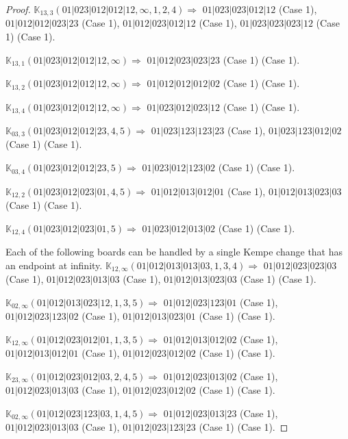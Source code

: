\documentclass[12pt]{article}
\newcommand{\K}{\mathbb{K}}
\begin{document}
\begin{proof}
\bigskip

$\K_{13,3}(01|023|012|012|12,\infty,1, 2, 4)\Rightarrow $ $01|023|023|012|12$ (Case 1), $01|012|012|023|23$ (Case 1), $01|012|023|012|12$ (Case 1), $01|023|023|023|12$ (Case 1) (Case 1).

$\K_{13,1}(01|023|012|012|12,\infty)\Rightarrow $ $01|012|023|023|23$ (Case 1) (Case 1).

$\K_{13,2}(01|023|012|012|12,\infty)\Rightarrow $ $01|012|012|012|02$ (Case 1) (Case 1).

$\K_{13,4}(01|023|012|012|12,\infty)\Rightarrow $ $01|023|012|023|12$ (Case 1) (Case 1).


\bigskip

$\K_{03,3}(01|023|012|012|23,4, 5)\Rightarrow $ $01|023|123|123|23$ (Case 1), $01|023|123|012|02$ (Case 1) (Case 1).

$\K_{03,4}(01|023|012|012|23,5)\Rightarrow $ $01|023|012|123|02$ (Case 1) (Case 1).


\bigskip

$\K_{12,2}(01|023|012|023|01,4, 5)\Rightarrow $ $01|012|013|012|01$ (Case 1), $01|012|013|023|03$ (Case 1) (Case 1).

$\K_{12,4}(01|023|012|023|01,5)\Rightarrow $ $01|023|012|013|02$ (Case 1) (Case 1).


\bigskip

Each of the following boards can be handled by a single Kempe change that has an endpoint at infinity.
$\K_{12,\infty}(01|012|013|013|03,1, 3, 4)\Rightarrow $ $01|012|023|023|03$ (Case 1), $01|012|023|013|03$ (Case 1), $01|012|013|023|03$ (Case 1) (Case 1).

\bigskip

$\K_{02,\infty}(01|012|013|023|12,1, 3, 5)\Rightarrow $ $01|012|023|123|01$ (Case 1), $01|012|023|123|02$ (Case 1), $01|012|013|023|01$ (Case 1) (Case 1).

\bigskip

$\K_{12,\infty}(01|012|023|012|01,1, 3, 5)\Rightarrow $ $01|012|013|012|02$ (Case 1), $01|012|013|012|01$ (Case 1), $01|012|023|012|02$ (Case 1) (Case 1).

\bigskip

$\K_{23,\infty}(01|012|023|012|03,2, 4, 5)\Rightarrow $ $01|012|023|013|02$ (Case 1), $01|012|023|013|03$ (Case 1), $01|012|023|012|02$ (Case 1) (Case 1).

\bigskip

$\K_{02,\infty}(01|012|023|123|03,1, 4, 5)\Rightarrow $ $01|012|023|013|23$ (Case 1), $01|012|023|013|03$ (Case 1), $01|012|023|123|23$ (Case 1) (Case 1).


\end{proof}
\end{document}
